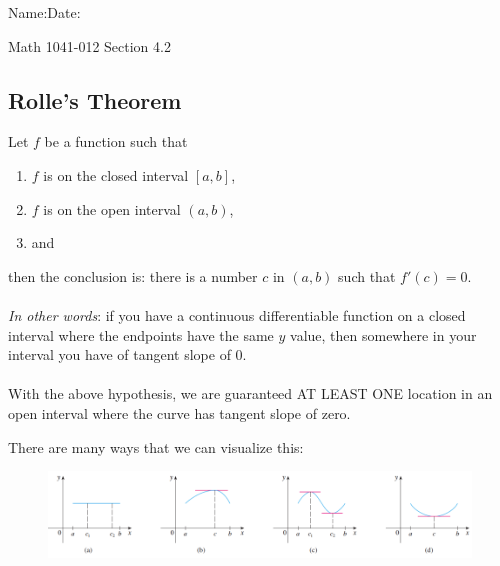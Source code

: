 \documentclass[10pt]{book}
\theoremstyle{definition}
\begin{document}
\begin{flushleft}
Name:\underline{\hspace{13cm}}Date:\underline{\hspace{2cm}}
\end{flushleft}
\begin{center}
{\Large Math 1041-012 \hspace{0.5cm} Section 4.2}
\end{center}

\begin{tcolorbox}
\subsection*{Rolle's Theorem}
Let $f$ be a function such that
\begin{enumerate}
    \item $f$ is \underline{\hspace{3cm}} on the closed interval $[a,b]$,
    \item $f$ is \underline{\hspace{3cm}} on the open interval $(a,b)$,
    \item and \underline{\hspace{3cm}}
\end{enumerate}
then the conclusion is: there is a number $c$ in $(a,b)$ such that $f'(c)=0$.\\ \\
\textit{In other words}: if you have a continuous differentiable function on a closed interval where the endpoints have the same $y$ value, then somewhere in your interval you have of tangent slope of 0.\\ \\
With the above hypothesis, we are guaranteed AT LEAST ONE location in an open interval where the curve has tangent slope of zero.
\end{tcolorbox}
There are many ways that we can visualize this:\\
\begin{figure}[h]
    \centering
    \includegraphics{RollesTheorem.png}
\end{figure}
\end{document}
